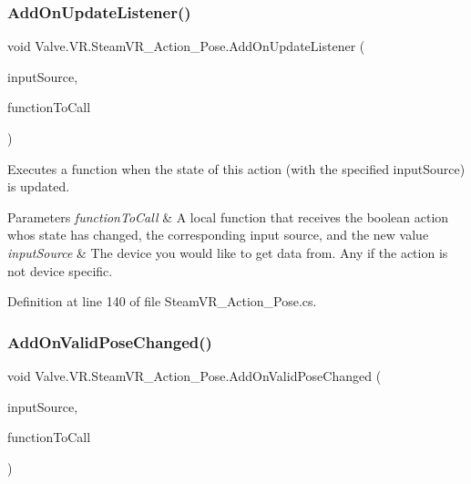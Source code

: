 \subsubsection{\texorpdfstring{AddOnUpdateListener()}{AddOnUpdateListener()}}
{\footnotesize\ttfamily void Valve.\+V\+R.\+Steam\+V\+R\+\_\+\+Action\+\_\+\+Pose.\+Add\+On\+Update\+Listener (\begin{DoxyParamCaption}\item[{\mbox{\hyperlink{namespace_valve_1_1_v_r_a82e5bf501cc3aa155444ee3f0662853f}{Steam\+V\+R\+\_\+\+Input\+\_\+\+Sources}}}]{input\+Source,  }\item[{\mbox{\hyperlink{class_valve_1_1_v_r_1_1_steam_v_r___action___pose_a243e7046a430c572e5be3d1b6b322b6d}{Update\+Handler}}}]{function\+To\+Call }\end{DoxyParamCaption})}



Executes a function when the state of this action (with the specified input\+Source) is updated. 


\begin{DoxyParams}{Parameters}
{\em function\+To\+Call} & A local function that receives the boolean action who\textquotesingle{}s state has changed, the corresponding input source, and the new value\\
\hline
{\em input\+Source} & The device you would like to get data from. Any if the action is not device specific.\\
\hline
\end{DoxyParams}


Definition at line 140 of file Steam\+V\+R\+\_\+\+Action\+\_\+\+Pose.\+cs.

\mbox{\label{class_valve_1_1_v_r_1_1_steam_v_r___action___pose_a0f4a6917e9c8d7b74c7284c29c6589a8}} 
\subsubsection{\texorpdfstring{AddOnValidPoseChanged()}{AddOnValidPoseChanged()}}
{\footnotesize\ttfamily void Valve.\+V\+R.\+Steam\+V\+R\+\_\+\+Action\+\_\+\+Pose.\+Add\+On\+Valid\+Pose\+Changed (\begin{DoxyParamCaption}\item[{\mbox{\hyperlink{namespace_valve_1_1_v_r_a82e5bf501cc3aa155444ee3f0662853f}{Steam\+V\+R\+\_\+\+Input\+\_\+\+Sources}}}]{input\+Source,  }\item[{\mbox{\hyperlink{class_valve_1_1_v_r_1_1_steam_v_r___action___pose_a742270a6bddfea2afd7f535378ae7830}{Valid\+Pose\+Change\+Handler}}}]{function\+To\+Call }\end{DoxyParamCaption})}



